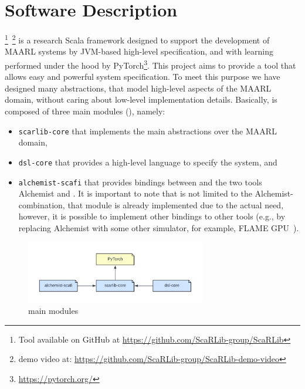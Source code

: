 %
\section{Software Description}\label{coordination2023:contribution}
\scarlib{} \footnote{Tool available on GitHub at \url{https://github.com/ScaRLib-group/ScaRLib}}~\footnote{demo video at: \url{https://github.com/ScaRLib-group/ScaRLib-demo-video}} is a research Scala framework designed to support
the development of \ac{MAARL} systems by JVM-based high-level specification, and with learning performed under the hood by PyTorch\footnote{\url{https://pytorch.org/}}.
%
This project aims to provide a tool that allows easy and powerful system specification.
%
To meet this purpose we have designed many abstractions, that model high-level aspects of the \ac{MAARL} domain, 
 without caring about low-level implementation details.
Basically, \scarlib{} is composed of three main modules (), namely: 
\begin{itemize}
    \item \texttt{scarlib-core} that implements the main abstractions over the \ac{MAARL} domain,
    \item \texttt{dsl-core} that provides a high-level language to specify the system, and
    \item \texttt{alchemist-scafi} that provides bindings between \scarlib{} and the two tools Alchemist and \scafi{}.
    It is important to note that \scarlib{} is not limited to the Alchemist-\scafi{} combination, that module is 
    already implemented due to the actual need, however, it is possible to implement other bindings to other tools
    (e.g., by replacing Alchemist with some other simulator, for example, FLAME GPU~\cite{flame}).
\end{itemize}
\begin{figure}[t]
    \centering
    \includegraphics[width=0.7\textwidth]{papers/coordination2023/imgs/scarlib-modules.pdf}
    \caption{\scarlib{} main modules}
    \label{coordination2023:fig:modules}
\end{figure}

